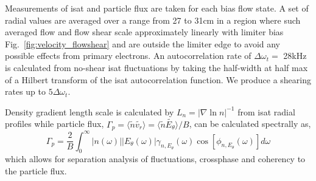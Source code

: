 \documentclass[%
 aps,
 prl,
 amsmath,amssymb,
 reprint,%
]{revtex4-1}
\begin{document}
Measurements of isat and particle flux are taken for each bias flow state. A set of radial values are averaged over a range from 27 to 31cm in a region where such averaged flow and flow shear scale approximately linearly with limiter bias Fig.~\ref{fig:velocity_flowshear} and are outside the limiter edge to avoid any possible effects from primary electrons. An autocorrelation rate of $\Delta \omega_{t} = $ 28kHz is calculated from no-shear isat fluctuations by taking the half-width at half max of a Hilbert transform of the isat autocorrelation function. We produce a shearing rates up to $5 \Delta \omega_{t}$.

Density gradient length scale is calculated by $L_{n} = \lvert \nabla \ln n \rvert ^{-1}$ from isat radial profiles while particle flux, $\Gamma_{p} = \langle \tilde{n} \tilde{v_{r}} \rangle = \langle \tilde{n} \tilde{E_{\theta}} \rangle /B$, can be calculated spectrally as\cite{powers74}, 
\begin{equation}
\Gamma_{p} = \frac{2}{B} \int^{\infty}_{0} \lvert n(\omega) \rvert \lvert E_{\theta}(\omega) \rvert \gamma_{n,E_{\theta}}(\omega) \cos [\phi_{n,E_{\theta}}(\omega)] d\omega
\label{eq:fluxint}
\end{equation}
which allows for separation analysis of fluctuations, crossphase and coherency to the particle flux.
\end{document}

